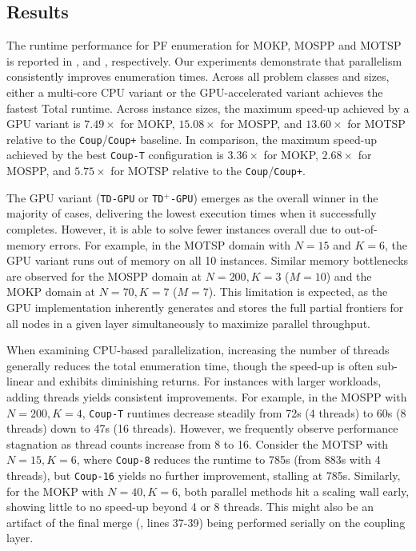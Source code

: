 \documentclass[letterpaper]{article}
\begin{document}
\subsection{Results}
The runtime performance for PF enumeration for MOKP, MOSPP and MOTSP is reported in ,  and , respectively. Our experiments demonstrate that parallelism consistently improves enumeration times. Across all problem classes and sizes, either a multi-core CPU variant or the GPU-accelerated variant achieves the fastest Total runtime. Across instance sizes, the maximum speed-up achieved by a GPU variant is $7.49\times$ for MOKP, $15.08\times$ for MOSPP, and $13.60\times$ for MOTSP relative to the \texttt{Coup}/\texttt{Coup+} baseline.
In comparison, the maximum speed-up achieved by the best \texttt{Coup-T} configuration is $3.36\times$ for MOKP, $2.68\times$ for MOSPP, and $5.75\times$ for MOTSP relative to the \texttt{Coup}/\texttt{Coup+}.

The GPU variant (\texttt{TD-GPU} or \texttt{TD}$^+$\texttt{-GPU}) emerges as the overall winner in the majority of cases, delivering the lowest execution times when it successfully completes. However, it is able to solve fewer instances overall due to out-of-memory errors. For example, in the MOTSP domain with $N=15$ and $K=6$, the GPU variant runs out of memory on all 10 instances. Similar memory bottlenecks are observed for the MOSPP domain at $N=200, K=3$ ($M=10$) and the MOKP domain at $N=70, K=7$ ($M=7$). This limitation is expected, as the GPU implementation inherently generates and stores the full partial frontiers for all nodes in a given layer simultaneously to maximize parallel throughput.

When examining CPU-based parallelization, increasing the number of threads generally reduces the total enumeration time, though the speed-up is often sub-linear and exhibits diminishing returns. For instances with larger workloads, adding threads yields consistent improvements. For example, in the MOSPP with $N=200, K=4$, \texttt{Coup-T} runtimes decrease steadily from 72s (4 threads) to 60s (8 threads) down to 47s (16 threads). However, we frequently observe performance stagnation as thread counts increase from 8 to 16. Consider the MOTSP with $N=15, K=6$, where \texttt{Coup-8} reduces the runtime to 785s (from 883s with 4 threads), but \texttt{Coup-16} yields no further improvement, stalling at 785s. Similarly, for the MOKP with $N=40, K=6$, both parallel methods hit a scaling wall early, showing little to no speed-up beyond 4 or 8 threads. This might also be an artifact of the final merge (, lines 37-39) being performed serially on the coupling layer.
\end{document}
